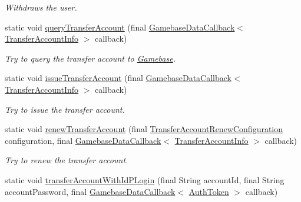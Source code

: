 \begin{DoxyCompactItemize}
\begin{DoxyCompactList}\small\item\em Withdraws the user. \end{DoxyCompactList}\item 
static void \hyperlink{classcom_1_1toast_1_1android_1_1gamebase_1_1_gamebase_aef6c37175f8a8b97e41cf1ae81b47853}{query\+Transfer\+Account} (final \hyperlink{interfacecom_1_1toast_1_1android_1_1gamebase_1_1_gamebase_data_callback}{Gamebase\+Data\+Callback}$<$ \hyperlink{classcom_1_1toast_1_1android_1_1gamebase_1_1auth_1_1transfer_1_1data_1_1_transfer_account_info}{Transfer\+Account\+Info} $>$ callback)
\begin{DoxyCompactList}\small\item\em Try to query the transfer account to \hyperlink{classcom_1_1toast_1_1android_1_1gamebase_1_1_gamebase}{Gamebase}. \end{DoxyCompactList}\item 
static void \hyperlink{classcom_1_1toast_1_1android_1_1gamebase_1_1_gamebase_a8b4208c1f02a43176a621de920d922a0}{issue\+Transfer\+Account} (final \hyperlink{interfacecom_1_1toast_1_1android_1_1gamebase_1_1_gamebase_data_callback}{Gamebase\+Data\+Callback}$<$ \hyperlink{classcom_1_1toast_1_1android_1_1gamebase_1_1auth_1_1transfer_1_1data_1_1_transfer_account_info}{Transfer\+Account\+Info} $>$ callback)
\begin{DoxyCompactList}\small\item\em Try to issue the transfer account. \end{DoxyCompactList}\item 
static void \hyperlink{classcom_1_1toast_1_1android_1_1gamebase_1_1_gamebase_a047d0d2590f3e4bb4933120ec6bc971d}{renew\+Transfer\+Account} (final \hyperlink{classcom_1_1toast_1_1android_1_1gamebase_1_1auth_1_1transfer_1_1data_1_1_transfer_account_renew_configuration}{Transfer\+Account\+Renew\+Configuration} configuration, final \hyperlink{interfacecom_1_1toast_1_1android_1_1gamebase_1_1_gamebase_data_callback}{Gamebase\+Data\+Callback}$<$ \hyperlink{classcom_1_1toast_1_1android_1_1gamebase_1_1auth_1_1transfer_1_1data_1_1_transfer_account_info}{Transfer\+Account\+Info} $>$ callback)
\begin{DoxyCompactList}\small\item\em Try to renew the transfer account. \end{DoxyCompactList}\item 
static void \hyperlink{classcom_1_1toast_1_1android_1_1gamebase_1_1_gamebase_a174f9e2e861ee3a4dfca710f01845da0}{transfer\+Account\+With\+Id\+P\+Login} (final String account\+Id, final String account\+Password, final \hyperlink{interfacecom_1_1toast_1_1android_1_1gamebase_1_1_gamebase_data_callback}{Gamebase\+Data\+Callback}$<$ \hyperlink{classcom_1_1toast_1_1android_1_1gamebase_1_1auth_1_1data_1_1_auth_token}{Auth\+Token} $>$ callback)

\end{DoxyCompactItemize}

